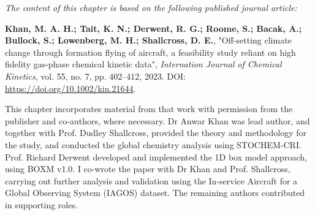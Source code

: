 \textit{The content of this chapter is based on the following published journal article:}

\textbf{Khan, M. A. H.; Tait, K. N.; Derwent, R. G.; Roome, S.; Bacak, A.; Bullock, S.; Lowenberg, M. H.; Shallcross, D. E.}, "Off-setting climate change through formation flying of aircraft, a feasibility study reliant on high fidelity gas-phase chemical kinetic data", \textit{Internation Journal of Chemical Kinetics}, vol. 55, no. 7, pp. 402--412, 2023. DOI: \url{https://doi.org/10.1002/kin.21644}.

This chapter incorporates material from that work with permission from the publisher and co-authors, where necessary. Dr Anwar Khan was lead author, and together with Prof. Dudley Shallcross, provided the theory and methodology for the study, and conducted the global chemistry analysis using STOCHEM-CRI. Prof. Richard Derwent developed and implemented the 1D box model approach, using BOXM v1.0. I co-wrote the paper with Dr Khan and Prof. Shallcross, carrying out further analysis and validation using the In-service Aircraft for a Global Observing System (IAGOS) dataset. The remaining authors contributed in supporting roles.







